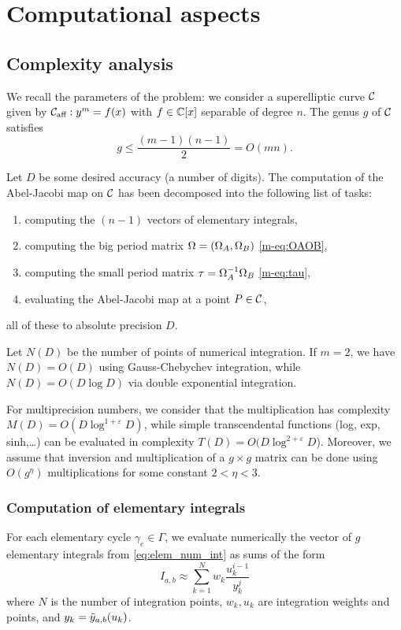 \documentclass[main.tex]{subfiles}
\begin{document}
  \section{Computational aspects}

   \subsection{Complexity analysis}

   We recall the parameters of the problem: we consider a superelliptic curve $\mathcal{C}$ given by
   $\mathcal{C}_{\text{aff}}:y^m=f(x)$ with $f \in \mathbb{C}[x]$ separable of degree $n$. The genus $g$ of $\mathcal{C}$ satisfies
   $$g \leq \frac{(m-1)(n-1)}2=O(mn).$$

   Let $D$ be some desired accuracy (a number of digits). The computation of
   the Abel-Jacobi map on $\mathcal{C}$ has been decomposed into the
   following list of tasks:
   \begin{enumerate}
       \item computing the $(n-1)$ vectors of elementary integrals,
       \item computing the big period matrix $\Omega=(\Omega_A,\Omega_B)$ \eqref{m-eq:OAOB},
       \item computing the small period matrix $\tau = \Omega_A^{-1}\Omega_B$ \eqref{m-eq:tau},
       \item evaluating the Abel-Jacobi map at a point $P \in \mathcal{C}$,
   \end{enumerate}
   all of these to absolute precision $D$.

   Let $N(D)$ be the number of points of numerical integration.
   If $m=2$, we have
   $N(D)=O(D)$ using Gauss-Chebychev integration, while $N(D)=O(D\log D)$
   via double exponential integration.

   For multiprecision numbers, we consider that the multiplication has
   complexity $M(D)=O(D \log^{1+\varepsilon}D)$,
   while simple transcendental functions (log, exp, sinh,\dots) can be evaluated
   in complexity $T(D)=O(D\log^{2+\varepsilon} D$).
    Moreover, we assume that inversion and multiplication of a $g \times g$ matrix can be done using
    $O(g^{\eta})$ multiplications for some constant $2 < \eta < 3$.
   
   \subsubsection{Computation of elementary integrals}

   For each elementary cycle $\gamma_e\in \Gamma$, we evaluate numerically the vector of $g$
   elementary integrals from \eqref{eq:elem_num_int} as sums of the form
   \begin{equation}
       I_{a,b} \approx \sum_{k=1}^N w_k\frac{u_k^{i-1}}{y_k^j}
   \end{equation}
   where $N$ is the number of integration points, $w_k,u_k$ are integration weights and points,
   and $y_k=\tilde{y}_{a,b}(u_k)$.
\end{document}

